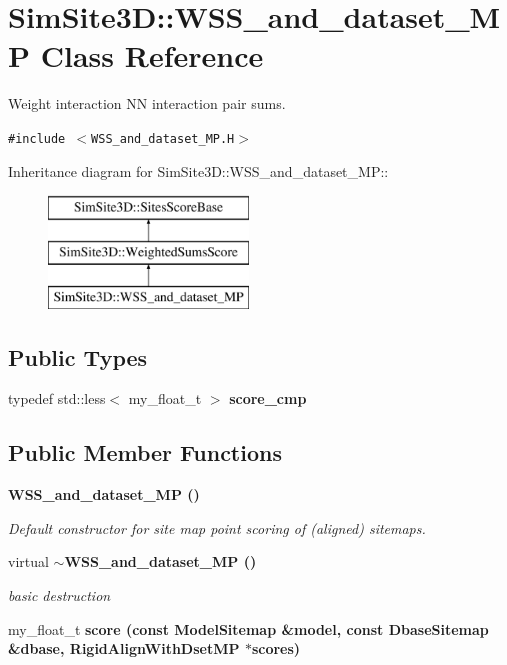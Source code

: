\section{SimSite3D::WSS\_\-and\_\-dataset\_\-MP Class Reference}
\label{classSimSite3D_1_1WSS__and__dataset__MP}
Weight interaction NN interaction pair sums.  


{\tt \#include $<$WSS\_\-and\_\-dataset\_\-MP.H$>$}

Inheritance diagram for SimSite3D::WSS\_\-and\_\-dataset\_\-MP::\begin{figure}[H]
\begin{center}
\leavevmode
\includegraphics[height=3cm]{classSimSite3D_1_1WSS__and__dataset__MP}
\end{center}
\end{figure}
\subsection*{Public Types}
\begin{CompactItemize}
\item 
typedef std::less$<$ my\_\-float\_\-t $>$ \textbf{score\_\-cmp}\label{classSimSite3D_1_1WSS__and__dataset__MP_f17104e906fa8b27692f8956cb88c5f6}

\end{CompactItemize}
\subsection*{Public Member Functions}
\begin{CompactItemize}
\item 
\bf{WSS\_\-and\_\-dataset\_\-MP} ()\label{classSimSite3D_1_1WSS__and__dataset__MP_9dcca2b8b93687cd031fae82a6327ffe}

\begin{CompactList}\small\item\em Default constructor for site map point scoring of (aligned) sitemaps. \item\end{CompactList}\item 
virtual \bf{$\sim$WSS\_\-and\_\-dataset\_\-MP} ()\label{classSimSite3D_1_1WSS__and__dataset__MP_51cabafd4f5038cb70d9fea0c5e97d49}

\begin{CompactList}\small\item\em basic destruction \item\end{CompactList}\item 
my\_\-float\_\-t \bf{score} (const \bf{Model\-Sitemap} \&model, const \bf{Dbase\-Sitemap} \&dbase, Rigid\-Align\-With\-Dset\-MP $\ast$scores)
\end{CompactItemize}


